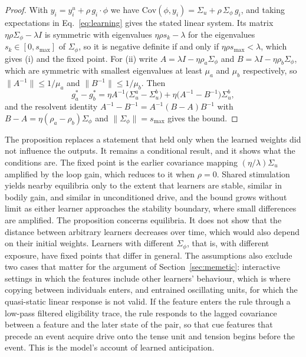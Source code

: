 \documentclass[11pt]{article}
\theoremstyle{plain}
\theoremstyle{definition}
\begin{document}
\begin{proof}
With $y_i=y_i^{u}+\rho\,g_i\cdot\phi$ we have $\mathrm{Cov}(\phi,y_i)=\Sigma_u+\rho\,\Sigma_\phi\,g_i$, and taking expectations in Eq.~\eqref{eq:learning} gives the stated linear system. Its matrix $\eta\rho\Sigma_\phi-\lambda I$ is symmetric with eigenvalues $\eta\rho s_k-\lambda$ for the eigenvalues $s_k\in[0,s_{\max}]$ of $\Sigma_\phi$, so it is negative definite if and only if $\eta\rho s_{\max}<\lambda$, which gives (i) and the fixed point. For (ii) write $A=\lambda I-\eta\rho_a\Sigma_\phi$ and $B=\lambda I-\eta\rho_b\Sigma_\phi$, which are symmetric with smallest eigenvalues at least $\mu_a$ and $\mu_b$ respectively, so $\|A^{-1}\|\le 1/\mu_a$ and $\|B^{-1}\|\le 1/\mu_b$. Then
\[
g_a^{\ast}-g_b^{\ast} = \eta A^{-1}\big(\Sigma_u^{a}-\Sigma_u^{b}\big) + \eta\big(A^{-1}-B^{-1}\big)\Sigma_u^{b},
\]
and the resolvent identity $A^{-1}-B^{-1}=A^{-1}(B-A)B^{-1}$ with $B-A=\eta(\rho_a-\rho_b)\Sigma_\phi$ and $\|\Sigma_\phi\|=s_{\max}$ gives the bound.
\end{proof}

The proposition replaces a statement that held only when the learned weights did not influence the outputs. It remains a conditional result, and it shows what the conditions are. The fixed point is the earlier covariance mapping $(\eta/\lambda)\Sigma_u$ amplified by the loop gain, which reduces to it when $\rho=0$. Shared stimulation yields nearby equilibria only to the extent that learners are stable, similar in bodily gain, and similar in unconditioned drive, and the bound grows without limit as either learner approaches the stability boundary, where small differences are amplified. The proposition concerns equilibria. It does not show that the distance between arbitrary learners decreases over time, which would also depend on their initial weights. Learners with different $\Sigma_\phi$, that is, with different exposure, have fixed points that differ in general. The assumptions also exclude two cases that matter for the argument of Section~\ref{sec:memetic}: interactive settings in which the features include other learners' behaviour, which is where copying between individuals enters, and entrained oscillating units, for which the quasi-static linear response is not valid. If the feature enters the rule through a low-pass filtered eligibility trace, the rule responds to the lagged covariance between a feature and the later state of the pair, so that cue features that precede an event acquire drive onto the tense unit and tension begins before the event. This is the model's account of learned anticipation.
\end{document}
